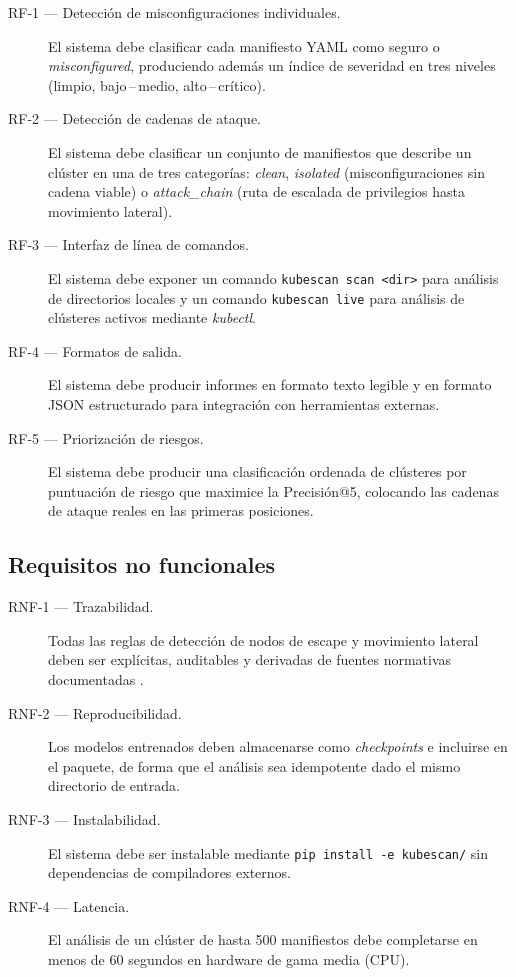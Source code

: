 \begin{description}
  \item[RF-1 — Detección de misconfiguraciones individuales.] El sistema debe clasificar
    cada manifiesto \acs{YAML} como seguro o \textit{misconfigured}, produciendo además un
    índice de severidad en tres niveles (limpio, bajo\,--\,medio, alto\,--\,crítico).
  \item[RF-2 — Detección de cadenas de ataque.] El sistema debe clasificar un conjunto
    de manifiestos que describe un clúster en una de tres categorías: \textit{clean},
    \textit{isolated} (misconfiguraciones sin cadena viable) o
    \textit{attack\_chain} (ruta de escalada de privilegios hasta movimiento lateral).
  \item[RF-3 — Interfaz de línea de comandos.] El sistema debe exponer un comando
    \texttt{kubescan scan <dir>} para análisis de directorios locales y un comando
    \texttt{kubescan live} para análisis de clústeres activos mediante \textit{kubectl}.
  \item[RF-4 — Formatos de salida.] El sistema debe producir informes en formato texto
    legible y en formato \acs{JSON} estructurado para integración con herramientas externas.
  \item[RF-5 — Priorización de riesgos.] El sistema debe producir una clasificación
    ordenada de clústeres por puntuación de riesgo que maximice la Precisión@5, colocando las
    cadenas de ataque reales en las primeras posiciones.
\end{description}

\subsection{Requisitos no funcionales}

\begin{description}
  \item[RNF-1 — Trazabilidad.] Todas las reglas de detección de nodos de escape y
    movimiento lateral deben ser explícitas, auditables y derivadas de fuentes
    normativas documentadas \citep{NSA2022,BishopFox2021}.
  \item[RNF-2 — Reproducibilidad.] Los modelos entrenados deben almacenarse como
    \textit{checkpoints} e incluirse en el paquete, de forma que el análisis sea
    idempotente dado el mismo directorio de entrada.
  \item[RNF-3 — Instalabilidad.] El sistema debe ser instalable mediante
    \texttt{pip install -e kubescan/} sin dependencias de compiladores externos.
  \item[RNF-4 — Latencia.] El análisis de un clúster de hasta 500 manifiestos debe
    completarse en menos de 60 segundos en hardware de gama media (CPU).
\end{description}

